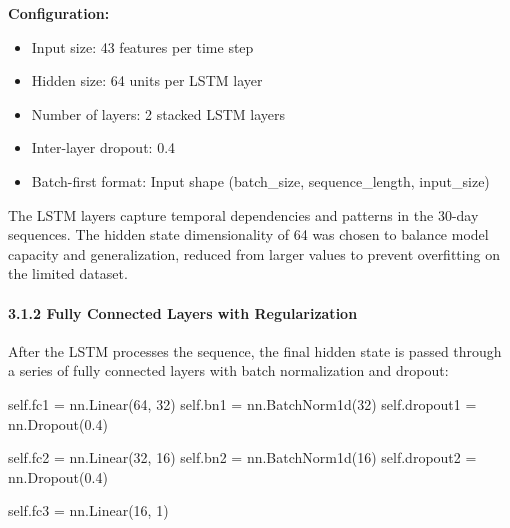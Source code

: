 \documentclass[
]{article}
\newenvironment{Shaded}{}{}
\newcommand{\DecValTok}[1]{\textcolor[rgb]{0.25,0.63,0.44}{#1}}
\newcommand{\FloatTok}[1]{\textcolor[rgb]{0.25,0.63,0.44}{#1}}
\newcommand{\NormalTok}[1]{#1}
\newcommand{\OperatorTok}[1]{\textcolor[rgb]{0.40,0.40,0.40}{#1}}
\newcommand{\VariableTok}[1]{\textcolor[rgb]{0.10,0.09,0.49}{#1}}
\begin{document}
\textbf{Configuration:}

\begin{itemize}
\item
  Input size: 43 features per time step
\item
  Hidden size: 64 units per LSTM layer
\item
  Number of layers: 2 stacked LSTM layers
\item
  Inter-layer dropout: 0.4
\item
  Batch-first format: Input shape (batch\_size, sequence\_length,
  input\_size)
\end{itemize}

The LSTM layers capture temporal dependencies and patterns in the 30-day
sequences. The hidden state dimensionality of 64 was chosen to balance
model capacity and generalization, reduced from larger values to prevent
overfitting on the limited dataset.

\paragraph{3.1.2 Fully Connected Layers with
Regularization}\label{312-fully-connected-layers-with-regularization}

After the LSTM processes the sequence, the final hidden state is passed
through a series of fully connected layers with batch normalization and
dropout:

\begin{Shaded}
\begin{Highlighting}[]
\VariableTok{self}\NormalTok{.fc1 }\OperatorTok{=}\NormalTok{ nn.Linear(}\DecValTok{64}\NormalTok{, }\DecValTok{32}\NormalTok{)}
\VariableTok{self}\NormalTok{.bn1 }\OperatorTok{=}\NormalTok{ nn.BatchNorm1d(}\DecValTok{32}\NormalTok{)}
\VariableTok{self}\NormalTok{.dropout1 }\OperatorTok{=}\NormalTok{ nn.Dropout(}\FloatTok{0.4}\NormalTok{)}

\VariableTok{self}\NormalTok{.fc2 }\OperatorTok{=}\NormalTok{ nn.Linear(}\DecValTok{32}\NormalTok{, }\DecValTok{16}\NormalTok{)}
\VariableTok{self}\NormalTok{.bn2 }\OperatorTok{=}\NormalTok{ nn.BatchNorm1d(}\DecValTok{16}\NormalTok{)}
\VariableTok{self}\NormalTok{.dropout2 }\OperatorTok{=}\NormalTok{ nn.Dropout(}\FloatTok{0.4}\NormalTok{)}

\VariableTok{self}\NormalTok{.fc3 }\OperatorTok{=}\NormalTok{ nn.Linear(}\DecValTok{16}\NormalTok{, }\DecValTok{1}\NormalTok{)}
\end{Highlighting}
\end{Shaded}
\end{document}
